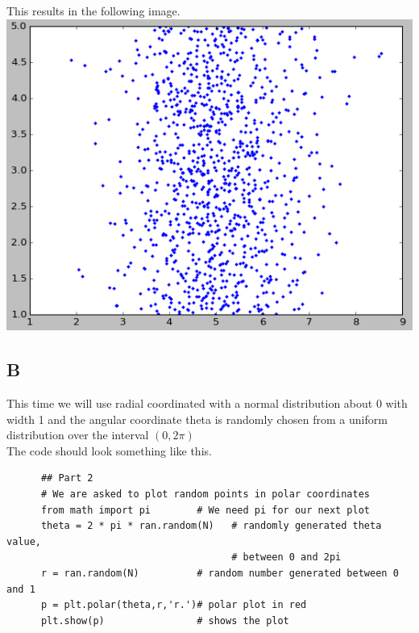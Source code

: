 \documentclass[11pt]{article}   %
\begin{document}
This results in the following image.\\
\includegraphics[scale=0.75]{Hw1Fig1.png}


\subsection*{B}
This time we will use radial coordinated with a normal distribution about 0 with width 1 and the angular coordinate theta is randomly chosen from a uniform distribution over the interval $(0,2\pi)$
\\
The code should look something like this.

\begin{tcolorbox}
   \begin{lstlisting}   
      ## Part 2
      # We are asked to plot random points in polar coordinates
      from math import pi        # We need pi for our next plot
      theta = 2 * pi * ran.random(N)   # randomly generated theta value, 
                                       # between 0 and 2pi
      r = ran.random(N)          # random number generated between 0 and 1
      p = plt.polar(theta,r,'r.')# polar plot in red
      plt.show(p)                # shows the plot
      \end{lstlisting}
\end{tcolorbox}
\end{document}
